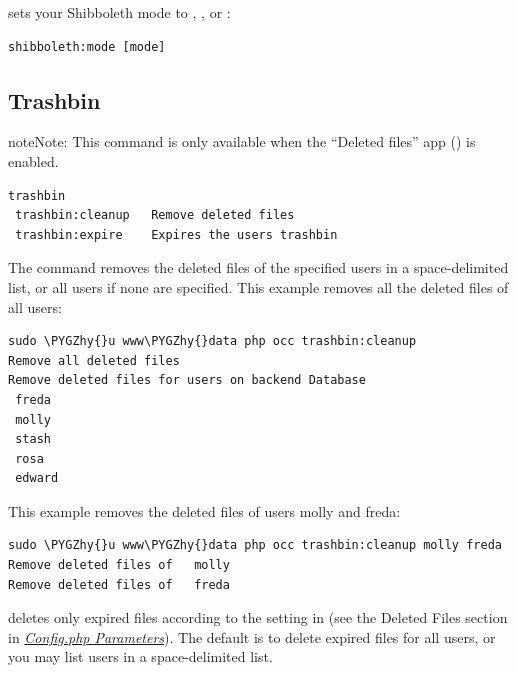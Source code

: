\documentclass[letterpaper,10pt,english]{sphinxmanual}
\def\PYGZhy{\char`\-}
\begin{document}
 sets your Shibboleth mode to ,
, or :

\begin{Verbatim}[commandchars=\\\{\}]
shibboleth:mode [mode]
\end{Verbatim}


\subsection{Trashbin}
\label{configuration_server/occ_command:trashbin-label}\label{configuration_server/occ_command:trashbin}
\begin{notice}{note}{Note:}
This command is only available when the ``Deleted files'' app
() is enabled.
\end{notice}

\begin{Verbatim}[commandchars=\\\{\}]
trashbin
 trashbin:cleanup   Remove deleted files
 trashbin:expire    Expires the users trashbin
\end{Verbatim}

The  command removes the deleted files of the specified
users in a space-delimited list, or all users if none are specified. This example removes all the deleted files of all users:

\begin{Verbatim}[commandchars=\\\{\}]
sudo \PYGZhy{}u www\PYGZhy{}data php occ trashbin:cleanup
Remove all deleted files
Remove deleted files for users on backend Database
 freda
 molly
 stash
 rosa
 edward
\end{Verbatim}

This example removes the deleted files of users molly and freda:

\begin{Verbatim}[commandchars=\\\{\}]
sudo \PYGZhy{}u www\PYGZhy{}data php occ trashbin:cleanup molly freda
Remove deleted files of   molly
Remove deleted files of   freda
\end{Verbatim}

 deletes only expired files according to the  setting in  (see the Deleted Files section in {\hyperref[configuration_server/config_sample_php_parameters::doc]{\emph{\emph{Config.php Parameters}}}}). The default is to delete expired files for all users, or you may list users in a space-delimited list.
\end{document}
